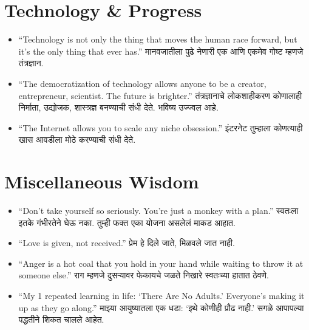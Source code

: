 \section*{Technology \& Progress}
\begin{itemize}
    \item ``Technology is not only the thing that moves the human race forward, but it’s the only thing that ever has.'' मानवजातीला पुढे नेणारी एक आणि एकमेव गोष्ट म्हणजे तंत्रज्ञान.

    \item ``The democratization of technology allows anyone to be a creator, entrepreneur, scientist. The future is brighter.'' तंत्रज्ञानाचे लोकशाहीकरण कोणालाही निर्माता, उद्योजक, शास्त्रज्ञ बनण्याची संधी देते. भविष्य उज्ज्वल आहे.

    \item ``The Internet allows you to scale any niche obsession.'' इंटरनेट तुम्हाला कोणत्याही खास आवडीला मोठे करण्याची संधी देते.
\end{itemize}

\section*{Miscellaneous Wisdom}
\begin{itemize}
    \item ``Don’t take yourself so seriously. You’re just a monkey with a plan.'' स्वतःला इतके गंभीरतेने घेऊ नका. तुम्ही फक्त एका योजना असलेलं माकड आहात.

    \item ``Love is given, not received.'' प्रेम हे दिले जाते, मिळवले जात नाही.

    \item ``Anger is a hot coal that you hold in your hand while waiting to throw it at someone else.'' राग म्हणजे दुसऱ्यावर फेकायचे जळते निखारे स्वतःच्या हातात ठेवणे.

    \item ``My 1 repeated learning in life: ‘There Are No Adults.’ Everyone’s making it up as they go along.'' माझ्या आयुष्यातला एक धडा: ‘इथे कोणीही प्रौढ नाही.’ सगळे आपापल्या पद्धतीने शिकत चालले आहेत.
\end{itemize}
